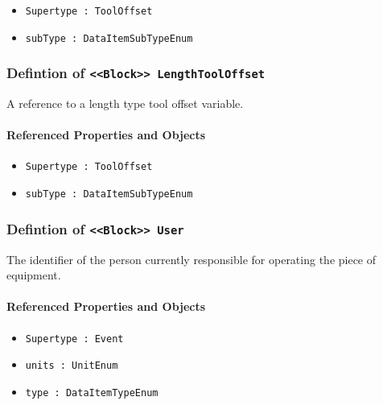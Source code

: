 \begin{itemize}
\item \texttt{Supertype : ToolOffset}

\item \texttt{subType : DataItemSubTypeEnum}

\end{itemize}
\FloatBarrier
\subsubsection{Defintion of \texttt{<<Block>> LengthToolOffset}}
  \label{type:LengthToolOffset}

\FloatBarrier

A reference to a length type tool offset variable.

\FloatBarrier
\paragraph{Referenced Properties and Objects}

\begin{itemize}
\item \texttt{Supertype : ToolOffset}

\item \texttt{subType : DataItemSubTypeEnum}

\end{itemize}
\FloatBarrier
\subsubsection{Defintion of \texttt{<<Block>> User}}
  \label{type:User}

\FloatBarrier

The identifier of the person currently responsible for operating the piece of equipment.

\FloatBarrier
\paragraph{Referenced Properties and Objects}

\begin{itemize}
\item \texttt{Supertype : Event}

\item \texttt{units : UnitEnum}

\item \texttt{type : DataItemTypeEnum}

\end{itemize}
\FloatBarrier

